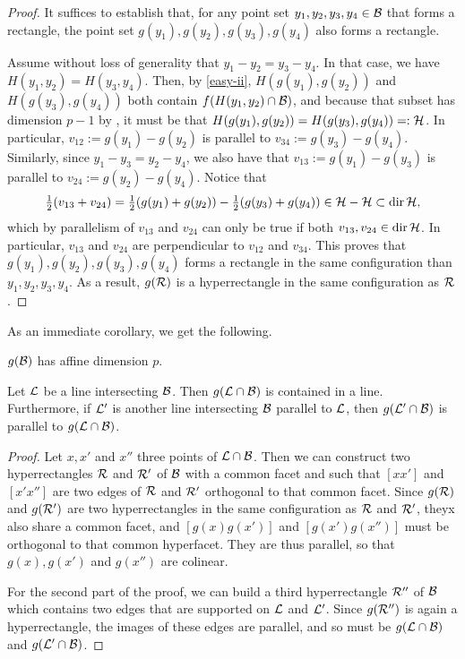 \documentclass[twoside, 11pt]{article}
\begin{document}
\begin{proof} 
It suffices to establish that, for any point set $y_1, y_2, y_3, y_4 \in \mathcal{B}$ that forms a rectangle, the point set $g(y_1), g(y_2), g(y_3), g(y_4)$ also forms a rectangle. 

Assume without loss of generality that $y_1-y_2 = y_3 - y_4$.
In that case, we have $H(y_1,y_2) = H(y_3,y_4)$.
Then, by \eqref{easy-ii}, $H(g(y_1),g(y_2))$ and $H(g(y_3),g(y_4))$ both contain $f(H(y_1,y_2) \cap \mathcal{B})$, and because that subset has dimension $p-1$ by , it must be that $H(g(y_1),g(y_2)) = H(g(y_3),g(y_4)) =: \mathcal{H}$.
In particular, $v_{12} := g(y_1)-g(y_2)$ is parallel to $v_{34} := g(y_3)-g(y_4)$. Similarly, since $y_1 - y_3 = y_2 - y_4$, we also have that $v_{13} :=  g(y_1)-g(y_3)$ is parallel to $v_{24} := g(y_2)-g(y_4)$. 
Notice that 
\[\tfrac12 (v_{13} + v_{24}) = \tfrac12 (g(y_1)+g(y_2)) - \tfrac12 (g(y_3)+g(y_4)) \in \mathcal{H} - \mathcal{H} \subset \operatorname{dir} \mathcal{H},\]
which by parallelism of $v_{13}$ and $v_{24}$ can only be true if both $v_{13}, v_{24} \in \operatorname{dir} \mathcal{H}$. 
In particular, $v_{13}$ and $v_{24}$ are perpendicular to $v_{12}$ and $v_{34}$.
This proves that $g(y_1),g(y_2),g(y_3),g(y_4)$ forms a rectangle in the same configuration than $y_1, y_2, y_3, y_4$. As a result, $g(\mathcal{R})$ is a hyperrectangle in the same configuration as $\mathcal{R}$.
\end{proof}

As an immediate corollary, we get the following.
\begin{corollary} \label{cor:gdimb} $g(\mathcal{B})$ has affine dimension $p$.
\end{corollary}

\begin{lemma} \label{lem:glineb} Let $\mathcal{L}$ be a line intersecting $\mathcal{B}$. Then $g(\mathcal{L} \cap \mathcal{B})$ is contained in a line. Furthermore, if $\mathcal{L}'$ is another line intersecting $\mathcal{B}$ parallel to $\mathcal{L}$, then $g(\mathcal{L}'\cap \mathcal{B})$ is parallel to $g(\mathcal{L}\cap\mathcal{B})$.
\end{lemma}

\begin{proof} Let $x,x'$ and $x''$ three points of $\mathcal{L} \cap \mathcal{B}$. Then we can construct two hyperrectangles $\mathcal{R}$ and $\mathcal{R}'$ of $\mathcal{B}$ with a common facet and such that $[xx']$ and $[x'x'']$ are two edges of $\mathcal{R}$ and $\mathcal{R}'$ orthogonal to that common facet. Since $g(\mathcal{R})$ and $g(\mathcal{R}')$ are two hyperrectangles in the same configuration as $\mathcal{R}$ and $\mathcal{R}'$, theyx also share a common facet, and $[g(x)g(x')]$ and $[g(x')g(x'')]$ must be orthogonal to that common hyperfacet. They are thus parallel, so that $g(x), g(x')$ and $g(x'')$ are colinear.

For the second part of the proof, we can build a third hyperrectangle $\mathcal{R}''$ of $\mathcal{B}$ which contains two edges that are supported on $\mathcal{L}$ and $\mathcal{L}'$. Since $g(\mathcal{R}'')$ is again a hyperrectangle, the images of these edges are parallel, and so must be $g(\mathcal{L}\cap\mathcal{B})$ and $g(\mathcal{L}'\cap\mathcal{B})$.
\end{proof}
\end{document}
